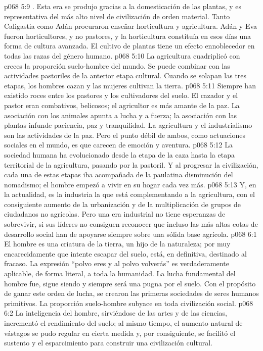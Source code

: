 \vs p068 5:9 \pc {}. Esta era se produjo gracias a la domesticación de las plantas, y es representativa del más alto nivel de civilización de orden material. Tanto Caligastia como Adán procuraron enseñar horticultura y agricultura. Adán y Eva fueron horticultores, y no pastores, y la horticultura constituía en esos días una forma de cultura avanzada. El cultivo de plantas tiene un efecto ennoblecedor en todas las razas del género humano.
\vs p068 5:10 La agricultura cuadriplicó con creces la proporción suelo\hyp{}hombre del mundo. Se puede combinar con las actividades pastoriles de la anterior etapa cultural. Cuando se solapan las tres etapas, los hombres cazan y las mujeres cultivan la tierra.
\vs p068 5:11 Siempre han existido roces entre los pastores y los cultivadores del suelo. El cazador y el pastor eran combativos, belicosos; el agricultor es más amante de la paz. La asociación con los animales apunta a lucha y a fuerza; la asociación con las plantas infunde paciencia, paz y tranquilidad. La agricultura y el industrialismo son las actividades de la paz. Pero el punto débil de ambos, como actuaciones sociales en el mundo, es que carecen de emoción y aventura.
\vs p068 5:12 \pc La sociedad humana ha evolucionado desde la etapa de la caza hasta la etapa territorial de la agricultura, pasando por la pastoril. Y al progresar la civilización, cada una de estas etapas iba acompañada de la paulatina disminución del nomadismo; el hombre empezó a vivir en su hogar cada vez más.
\vs p068 5:13 Y, en la actualidad, es la industria la que está complementando a la agricultura, con el consiguiente aumento de la urbanización y de la multiplicación de grupos de ciudadanos no agrícolas. Pero una era industrial no tiene esperanzas de sobrevivir, si sus líderes no consiguen reconocer que incluso las más altas cotas de desarrollo social han de apoyarse siempre sobre una sólida base agrícola.
\vs p068 6:1 El hombre es una criatura de la tierra, un hijo de la naturaleza; por muy encarecidamente que intente escapar del suelo, está, en definitiva, destinado al fracaso. La expresión “polvo eres y al polvo volverás” es verdaderamente aplicable, de forma literal, a toda la humanidad. La lucha fundamental del hombre fue, sigue siendo y siempre será una pugna por el suelo. Con el propósito de ganar este orden de lucha, se crearon las primeras sociedades de seres humanos primitivos. La proporción suelo\hyp{}hombre subyace en toda civilización social.
\vs p068 6:2 La inteligencia del hombre, sirviéndose de las artes y de las ciencias, incrementó el rendimiento del suelo; al mismo tiempo, el aumento natural de vástagos se pudo regular en cierta medida y, por consiguiente, se facilitó el sustento y el esparcimiento para construir una civilización cultural.
